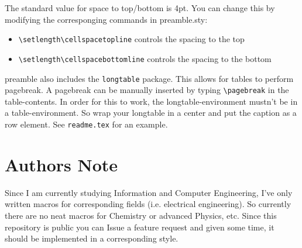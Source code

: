 \documentclass{report}
\begin{document}
    The standard value for space to top/bottom is 4pt. You can change this by modifying the corresponging commands
    in preamble.sty:
    \begin{itemize}
      \item \lstinline|\setlength\cellspacetopline|  controls the spacing to the top
      \item \lstinline|\setlength\cellspacebottomline| controls the spacing to the bottom
    \end{itemize}

    preamble also includes the \lstinline|longtable| package. This allows for tables to perform pagebreak. A
    pagebreak can be manually inserted by typing \lstinline|\pagebreak| in the table-contents. In order for
    this to work, the longtable-environment mustn't be in a table-environment. So wrap your longtable in
    a center and put the caption as a row element. See \lstinline|readme.tex| for an example.

  \section{Authors Note}
    Since I am currently studying Information and Computer Engineering, I've only written macros for 
    corresponding fields (i.e. electrical engineering). So currently there are no neat macros for Chemistry or
    advanced Physics, etc. Since this repository is public you can Issue a feature request and given some 
    time, it should be implemented in a corresponding style.
\end{document}
